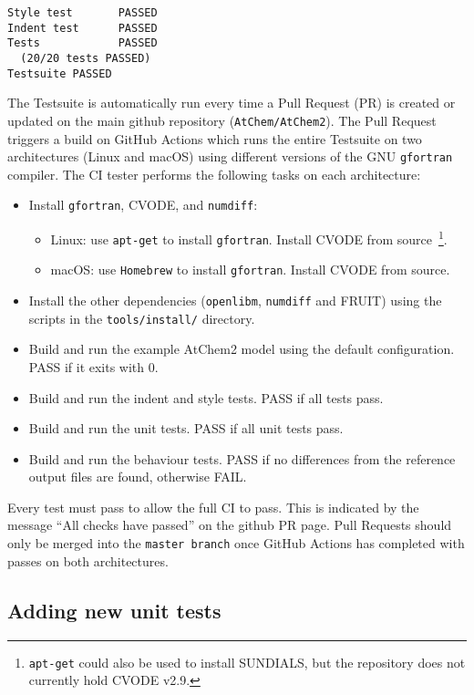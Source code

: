 \begin{verbatim}
Style test       PASSED
Indent test      PASSED
Tests            PASSED
  (20/20 tests PASSED)
Testsuite PASSED
\end{verbatim}

The Testsuite is automatically run every time a Pull Request (PR) is created
or updated on the main github repository (\texttt{AtChem/AtChem2}).  The Pull
Request triggers a build on GitHub Actions which runs the entire Testsuite on
two architectures (Linux and macOS) using different versions of the GNU
\texttt{gfortran} compiler. The CI tester performs the following tasks on each
architecture:

\begin{itemize}
\item Install \texttt{gfortran}, CVODE, and \texttt{numdiff}:
  \begin{itemize}
  \item Linux: use \texttt{apt-get} to install \texttt{gfortran}. Install
    CVODE from source~\footnote{\texttt{apt-get} could also be used to install
      SUNDIALS, but the repository does not currently hold CVODE v2.9.}.
  \item macOS: use \texttt{Homebrew} to install \texttt{gfortran}. Install
    CVODE from source.
  \end{itemize}
\item Install the other dependencies (\texttt{openlibm}, \texttt{numdiff} and
  FRUIT) using the scripts in the \texttt{tools/install/} directory.
\item Build and run the example AtChem2 model using the default
  configuration. PASS if it exits with 0.
\item Build and run the indent and style tests. PASS if all tests pass.
\item Build and run the unit tests. PASS if all unit tests pass.
\item Build and run the behaviour tests. PASS if no differences from
  the reference output files are found, otherwise FAIL.
\end{itemize}

Every test must pass to allow the full CI to pass. This is indicated
by the message ``All checks have passed'' on the github PR page. Pull
Requests should only be merged into the \texttt{master\ branch} once
GitHub Actions has completed with passes on both architectures.

\subsection{Adding new unit tests} \label{subsec:adding-new-unit-tests}

